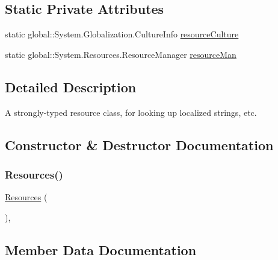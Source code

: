 \subsection*{Static Private Attributes}
\begin{DoxyCompactItemize}
\item 
static global\+::\+System.\+Globalization.\+Culture\+Info \hyperlink{classWildlifeTrackingApp_1_1Properties_1_1Resources_a87058a34a8b44628f03942ac02c08560}{resource\+Culture}
\item 
static global\+::\+System.\+Resources.\+Resource\+Manager \hyperlink{classWildlifeTrackingApp_1_1Properties_1_1Resources_a5a5d416265010ce4273651e495fda152}{resource\+Man}
\end{DoxyCompactItemize}


\subsection{Detailed Description}
A strongly-\/typed resource class, for looking up localized strings, etc. 



\subsection{Constructor \& Destructor Documentation}
\mbox{\label{classWildlifeTrackingApp_1_1Properties_1_1Resources_aa240237f3113fca394c94bb8a463429f}} 
\subsubsection{\texorpdfstring{Resources()}{Resources()}}
{\footnotesize\ttfamily \hyperlink{classWildlifeTrackingApp_1_1Properties_1_1Resources}{Resources} (\begin{DoxyParamCaption}{ }\end{DoxyParamCaption})\hspace{0.3cm}{\ttfamily [inline]}, {\ttfamily [package]}}



\subsection{Member Data Documentation}
\mbox{\label{classWildlifeTrackingApp_1_1Properties_1_1Resources_a87058a34a8b44628f03942ac02c08560}} 
